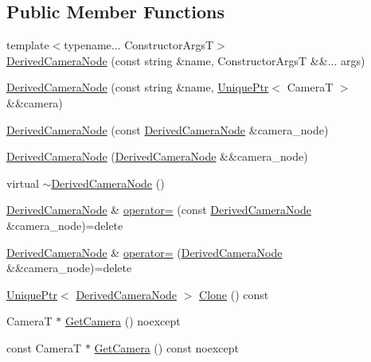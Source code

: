 \subsection*{Public Member Functions}
\begin{DoxyCompactItemize}
\item 
{\footnotesize template$<$typename... Constructor\+ArgsT$>$ }\\\hyperlink{classmage_1_1_derived_camera_node_a782a23d04ba78be88b0f73d9dde4552f}{Derived\+Camera\+Node} (const string \&name, Constructor\+ArgsT \&\&... args)
\item 
\hyperlink{classmage_1_1_derived_camera_node_a629ba0e2c1e6b29e6d45996256c59dbe}{Derived\+Camera\+Node} (const string \&name, \hyperlink{namespacemage_a3316d7143a973e37adf1110f2e80ca31}{Unique\+Ptr}$<$ CameraT $>$ \&\&camera)
\item 
\hyperlink{classmage_1_1_derived_camera_node_ae97b2a006e9e465e2530fdb814e855da}{Derived\+Camera\+Node} (const \hyperlink{classmage_1_1_derived_camera_node}{Derived\+Camera\+Node} \&camera\+\_\+node)
\item 
\hyperlink{classmage_1_1_derived_camera_node_a4c53aa526ee4f81a8d9cf8439650d291}{Derived\+Camera\+Node} (\hyperlink{classmage_1_1_derived_camera_node}{Derived\+Camera\+Node} \&\&camera\+\_\+node)
\item 
virtual \hyperlink{classmage_1_1_derived_camera_node_a74ab678b593c43b6bf95bb7fbfbd4d2d}{$\sim$\+Derived\+Camera\+Node} ()
\item 
\hyperlink{classmage_1_1_derived_camera_node}{Derived\+Camera\+Node} \& \hyperlink{classmage_1_1_derived_camera_node_a827c7952e061c6e12e38fff12585b3b3}{operator=} (const \hyperlink{classmage_1_1_derived_camera_node}{Derived\+Camera\+Node} \&camera\+\_\+node)=delete
\item 
\hyperlink{classmage_1_1_derived_camera_node}{Derived\+Camera\+Node} \& \hyperlink{classmage_1_1_derived_camera_node_a5faeff6f71a85b46d18f5b55e8dcf756}{operator=} (\hyperlink{classmage_1_1_derived_camera_node}{Derived\+Camera\+Node} \&\&camera\+\_\+node)=delete
\item 
\hyperlink{namespacemage_a3316d7143a973e37adf1110f2e80ca31}{Unique\+Ptr}$<$ \hyperlink{classmage_1_1_derived_camera_node}{Derived\+Camera\+Node} $>$ \hyperlink{classmage_1_1_derived_camera_node_a29e597fe2c9e0f37eeab8fec5330d764}{Clone} () const
\item 
CameraT $\ast$ \hyperlink{classmage_1_1_derived_camera_node_a423d9e416aec8ade92d0d2211d40de39}{Get\+Camera} () noexcept
\item 
const CameraT $\ast$ \hyperlink{classmage_1_1_derived_camera_node_aef2db8d343aeebc95c433150e234481a}{Get\+Camera} () const noexcept
\end{DoxyCompactItemize}
